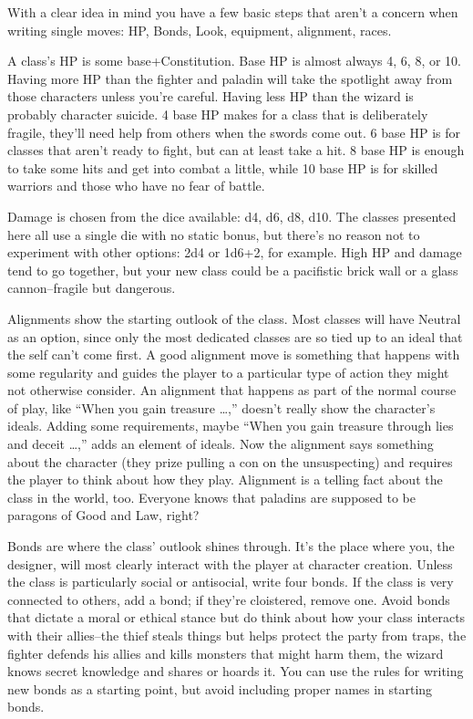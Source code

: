  With a clear idea in mind you have a few basic steps that aren't a concern when writing single moves: HP, Bonds, Look, equipment, alignment, races.


 A class's HP is some base+Constitution. Base HP is almost always 4, 6, 8, or 10. Having more HP than the fighter and paladin will take the spotlight away from those characters unless you're careful. Having less HP than the wizard is probably character suicide. 4 base HP makes for a class that is deliberately fragile, they'll need help from others when the swords come out. 6 base HP is for classes that aren't ready to fight, but can at least take a hit. 8 base HP is enough to take some hits and get into combat a little, while 10 base HP is for skilled warriors and those who have no fear of battle.


 Damage is chosen from the dice available: d4, d6, d8, d10. The classes presented here all use a single die with no static bonus, but there's no reason not to experiment with other options: 2d4 or 1d6+2, for example. High HP and damage tend to go together, but your new class could be a pacifistic brick wall or a glass cannon--fragile but dangerous.


 Alignments show the starting outlook of the class. Most classes will have Neutral as an option, since only the most dedicated classes are so tied up to an ideal that the self can't come first. A good alignment move is something that happens with some regularity and guides the player to a particular type of action they might not otherwise consider. An alignment that happens as part of the normal course of play, like ``When you gain treasure \ldots ,'' doesn't really show the character's ideals. Adding some requirements, maybe ``When you gain treasure through lies and deceit \ldots ,'' adds an element of ideals. Now the alignment says something about the character (they prize pulling a con on the unsuspecting) and requires the player to think about how they play. Alignment is a telling fact about the class in the world, too. Everyone knows that paladins are supposed to be paragons of Good and Law, right?


 Bonds are where the class' outlook shines through. It's the place where you, the designer, will most clearly interact with the player at character creation. Unless the class is particularly social or antisocial, write four bonds. If the class is very connected to others, add a bond; if they're cloistered, remove one. Avoid bonds that dictate a moral or ethical stance but do think about how your class interacts with their allies--the thief steals things but helps protect the party from traps, the fighter defends his allies and kills monsters that might harm them, the wizard knows secret knowledge and shares or hoards it. You can use the rules for writing new bonds as a starting point, but avoid including proper names in starting bonds.


